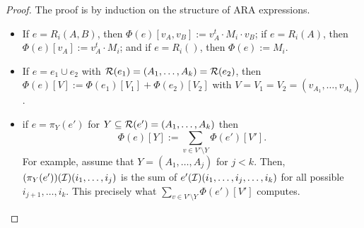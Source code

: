 \begin{proof}
The proof is  by induction on the structure of ARA expressions.
\begin{itemize}
\item If $e=R_i(A,B)$, then $\Phi(e)[v_A,v_B]:=v_A^t\cdot M_i\cdot v_B$; if $e=R_i(A)$, then $\Phi(e)[v_A]:=v_A^t\cdot M_i$; and if 
$e=R_i()$, then $\Phi(e):=M_i$.
\item If $e=e_1\cup e_2$ with $\mathcal{R}(e_1)=(A_1,\ldots,A_k)=\mathcal{R}(e_2)$, then 
$\Phi(e)[V]:=\Phi(e_1)[V_1]+\Phi(e_2)[V_2]$ with $V=V_1=V_2=(v_{A_1},\ldots,v_{A_k})$.
\item if $e=\pi_{Y}(e')$ for $Y\subseteq \mathcal{R}(e')=(A_1,\ldots,A_k)$ then 
$$
\Phi(e)[Y]:=\sum_{v\in V'\setminus Y} \Phi(e')[V'].
$$
For example,  assume that $Y=(A_1,\ldots,A_j)$ for $j<k$. Then,
$(\pi_Y(e'))(\mathcal{I})(i_1,\ldots,i_j)$ is the sum of  $e'(\mathcal{I})(i_1,\ldots,i_j,\ldots,i_k)$
for all possible $i_{j+1},\ldots, i_k$. This precisely what $\sum_{v\in V'\setminus Y} \Phi(e')[V']$ computes.


\end{itemize}
\end{proof}
